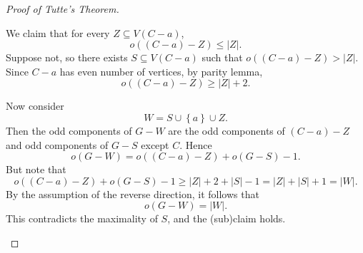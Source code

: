 \documentclass[co342]{subfiles}
\begin{document}
\begin{proof}[Proof of Tutte's Theorem]
\begin{itemize}
\begin{itemize}
\begin{itemize}
                                \begin{subproof}
                                    We claim that for every $Z\subseteq V\left( C-a \right)$,
                                    \begin{equation*}
                                        o\left( \left( C-a \right)-Z \right)\leq \left| Z \right|.
                                    \end{equation*}
                                    Suppose not, so there exists $S\subseteq V\left( C-a \right)$ such that $o\left( \left( C-a \right)-Z \right)>\left| Z \right|$. Since $C-a$ has even number of vertices, by parity lemma, 
                                    \begin{equation*}
                                        o\left( \left( C-a \right)-Z \right)\geq \left| Z \right|+2.
                                    \end{equation*}

                                    Now consider
                                    \begin{equation*}
                                        W = S\cup\left\lbrace a \right\rbrace\cup Z.
                                    \end{equation*}
                                    Then the odd components of $G-W$ are the odd components of $\left( C-a \right)-Z$ and odd components of $G-S$ except $C$. Hence
                                    \begin{equation*}
                                        o\left( G-W \right) = o\left( \left( C-a \right)-Z \right)+o\left( G-S \right)-1.
                                    \end{equation*}
                                    But note that
                                    \begin{equation*}
                                        o\left( \left( C-a \right)-Z \right)+o\left( G-S \right) - 1\geq \left| Z \right|+2+\left| S \right|-1 = \left| Z \right|+\left| S \right|+1 = \left| W \right|.
                                    \end{equation*}
                                    By the assumption of the reverse direction, it follows that
                                    \begin{equation*}
                                        o\left( G-W \right) = \left| W \right|.
                                    \end{equation*}
                                    This contradicts the maximality of $S$, and the (sub)claim holds.


\end{subproof}
\end{itemize}
\end{itemize}
\end{itemize}
\end{proof}
\end{document}
